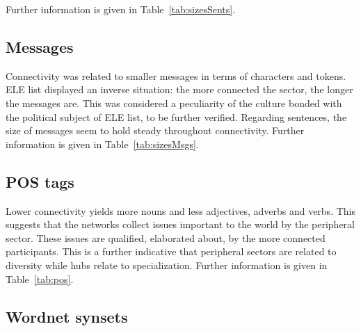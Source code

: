 \documentclass[%
 aip,
 jmp,%
 amsmath,amssymb,
 reprint,%
]{revtex4-1}
\begin{document}
Further information is given in Table~\ref{tab:sizesSents}.

\subsection{Messages}\label{subsec:mm}

Connectivity was related to smaller messages in terms of characters and tokens.
ELE list displayed an inverse situation:
the more connected the sector,
the longer the messages are.
This was considered a peculiarity of the culture bonded
with the political subject of ELE list, to be further verified.
Regarding sentences,
the size of messages seem to hold steady throughout connectivity.
Further information is given in Table~\ref{tab:sizesMsgs}.

\subsection{POS tags}\label{subsec:pos}

Lower connectivity yields more nouns and less adjectives,
adverbs and verbs.
This suggests that the networks collect issues important
to the world by the peripheral sector. 
These issues are qualified, elaborated about,
by the more connected participants.
This is a further indicative that peripheral sectors
are related to diversity while hubs relate to specialization.
Further information is given in Table~\ref{tab:pos}.

\subsection{Wordnet synsets}\label{subsec:pos}

%
%
%
%
%
%
%
%
%
%
%
%
%
\end{document}
